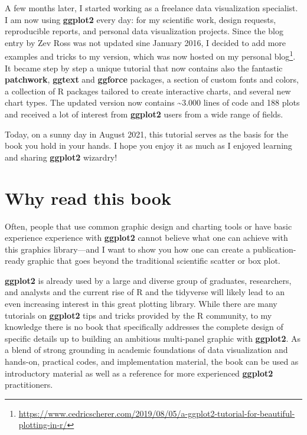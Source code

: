 \documentclass[
]{krantz}
\renewcommand{\href}[2]{#2\footnote{\url{#1}}}
\begin{document}
A few months later, I started working as a freelance data visualization specialist. I am now using \textbf{ggplot2} every day: for my scientific work, design requests, reproducible reports, and personal data visualization projects. Since the blog entry by Zev Ross was not updated sine January 2016, I decided to add more examples and tricks to my version, which was now hosted on my \href{https://www.cedricscherer.com/2019/08/05/a-ggplot2-tutorial-for-beautiful-plotting-in-r/}{personal blog}. It became step by step a unique tutorial that now contains also the fantastic \textbf{patchwork}, \textbf{ggtext} and \textbf{ggforce} packages, a section of custom fonts and colors, a collection of R packages tailored to create interactive charts, and several new chart types. The updated version now contains \textasciitilde3.000 lines of code and 188 plots and received a lot of interest from \textbf{ggplot2} users from a wide range of fields.

Today, on a sunny day in August 2021, this tutorial serves as the basis for the book you hold in your hands. I hope you enjoy it as much as I enjoyed learning and sharing \textbf{ggplot2} wizardry!

\hypertarget{why-read-this-book}{%
\section*{Why read this book}\label{why-read-this-book}}


Often, people that use common graphic design and charting tools or have basic experience experience with \textbf{ggplot2} cannot believe what one can achieve with this graphics library---and I want to show you how one can create a publication-ready graphic that goes beyond the traditional scientific scatter or box plot.

\textbf{ggplot2} is already used by a large and diverse group of graduates, researchers, and analysts and the current rise of R and the tidyverse will likely lead to an even increasing interest in this great plotting library. While there are many tutorials on \textbf{ggplot2} tips and tricks provided by the R community, to my knowledge there is no book that specifically addresses the complete design of specific details up to building an ambitious multi-panel graphic with \textbf{ggplot2}. As a blend of strong grounding in academic foundations of data visualization and hands-on, practical codes, and implementation material, the book can be used as introductory material as well as a reference for more experienced \textbf{ggplot2} practitioners.
\end{document}
